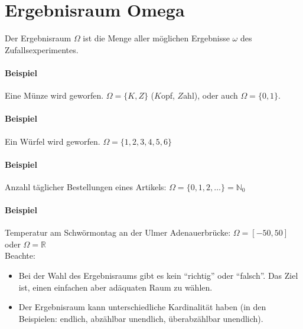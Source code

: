 \section{Ergebnisraum Omega}
Der Ergebnisraum $\Omega$ ist die Menge aller möglichen Ergebnisse $\omega$ des
Zufallsexperimentes.

\paragraph{Beispiel} Eine Münze wird geworfen. $\Omega = \{K, Z\}$ ($K$opf, $Z$ahl), oder auch
$\Omega = \{0, 1\}$.

\paragraph{Beispiel} Ein Würfel wird geworfen. $\Omega = \{1,2,3,4,5,6\}$

\paragraph{Beispiel} Anzahl täglicher Bestellungen eines Artikels:
$\Omega = \{0,1,2,\dots\} = \mathbb{N}_0$

\paragraph{Beispiel} Temperatur am Schwörmontag an der Ulmer Adenauerbrücke:
$\Omega = [-50,50]$ oder $\Omega = \mathbb{R}$
\\

Beachte:
\begin{itemize}
    \item Bei der Wahl des Ergebnisraums gibt es kein \enquote{richtig} oder \enquote{falsch}.
          Das Ziel ist, einen einfachen aber adäquaten Raum zu wählen.
    \item Der Ergebnisraum kann unterschiedliche Kardinalität haben
          (in den Beispielen: endlich, abzählbar unendlich, überabzählbar unendlich).
\end{itemize}
